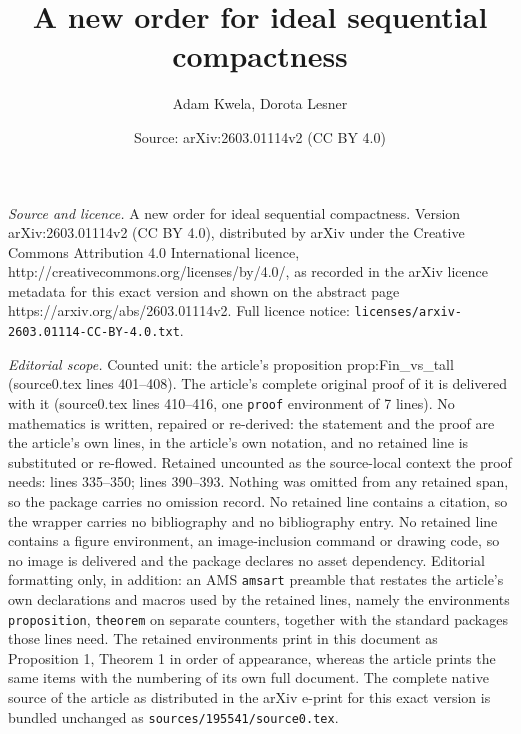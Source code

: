\documentclass[10pt,a4paper]{amsart}
\title{A new order for ideal sequential compactness}
\author{Adam Kwela, Dorota Lesner}
\date{Source: arXiv:2603.01114v2 (CC BY 4.0)}
\begin{document}
\maketitle

\noindent\emph{Source and licence.} A new order for ideal sequential compactness. Version arXiv:2603.01114v2 (CC BY 4.0), distributed by arXiv under the Creative Commons Attribution 4.0 International licence, http://creativecommons.org/licenses/by/4.0/, as recorded in the arXiv licence metadata for this exact version and shown on the abstract page https://arxiv.org/abs/2603.01114v2. Full licence notice: \texttt{licenses/arxiv-2603.01114-CC-BY-4.0.txt}.\par\smallskip

\noindent\textit{Editorial scope.} Counted unit: the article's proposition prop:Fin\_vs\_tall (source0.tex lines 401--408). The article's complete original proof of it is delivered with it (source0.tex lines 410--416, one \texttt{proof} environment of 7 lines). No mathematics is written, repaired or re-derived: the statement and the proof are the article's own lines, in the article's own notation, and no retained line is substituted or re-flowed.  Retained uncounted as the source-local context the proof needs: lines 335--350; lines 390--393.  Nothing was omitted from any retained span, so the package carries no omission record.  No retained line contains a citation, so the wrapper carries no bibliography and no bibliography entry.  No retained line contains a figure environment, an image-inclusion command or drawing code, so no image is delivered and the package declares no asset dependency.  Editorial formatting only, in addition: an AMS \texttt{amsart} preamble that restates the article's own declarations and macros used by the retained lines, namely the environments \texttt{proposition}, \texttt{theorem} on separate counters, together with the standard packages those lines need.  The retained environments print in this document as Proposition 1, Theorem 1 in order of appearance, whereas the article prints the same items with the numbering of its own full document.  The complete native source of the article as distributed in the arXiv e-print for this exact version is bundled unchanged as \texttt{sources/195541/source0.tex}.
\end{document}
